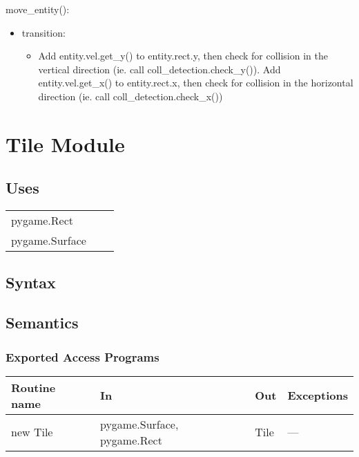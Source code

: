 \documentclass[12pt]{article}
\begin{document}
move\_entity():
\begin{itemize}
    \item transition: 
    \begin{itemize}[]
        \item Add entity.vel.get\_y() to entity.rect.y, then check for collision in the vertical direction (ie. call coll\_detection.check\_y()). Add entity.vel.get\_x() to entity.rect.x, then check for collision in the horizontal direction (ie. call coll\_detection.check\_x())
    \end{itemize}
\end{itemize}

\newpage

\section*{Tile Module}

\subsection* {Uses}

\begin{tabular}{lll}
    pygame.Rect & & \\
    pygame.Surface & & \\
\end{tabular}

\subsection* {Syntax}

\subsection* {Semantics}

\subsubsection* {Exported Access Programs}

\begin{tabular}{| l | l | l | l |}
\hline
\textbf{Routine name} & \textbf{In} & \textbf{Out} & \textbf{Exceptions}\\
\hline
new Tile & pygame.Surface, pygame.Rect & Tile & ---\\
\hline
\end{tabular}
\end{document}
